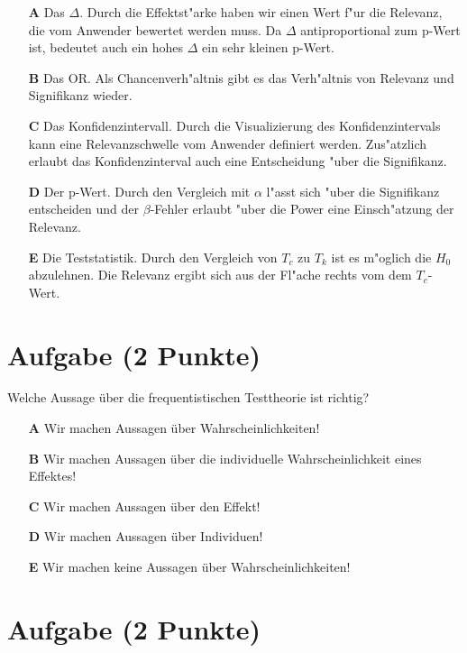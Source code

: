 \documentclass[a4paper, 10pt]{scrartcl}\usepackage[]{graphicx}\usepackage[]{xcolor}
\begin{document}
\begin{enumerate}
\item [\textbf{A} \msquare] Das $\Delta$. Durch die Effektst{"a}rke haben wir einen Wert f{"u}r die Relevanz, die vom Anwender bewertet werden muss. Da $\Delta$ antiproportional zum p-Wert ist, bedeutet auch ein hohes $\Delta$ ein sehr kleinen p-Wert.
\item [\textbf{B} \msquare] Das OR. Als Chancenverh{"a}ltnis gibt es das Verh{"a}ltnis von Relevanz und Signifikanz wieder.
\item [\textbf{C} \msquare] Das Konfidenzintervall. Durch die Visualizierung des Konfidenzintervals kann eine Relevanzschwelle vom Anwender definiert werden. Zus{"a}tzlich erlaubt das Konfidenzinterval auch eine Entscheidung {"u}ber die Signifikanz.
\item [\textbf{D} \msquare] Der p-Wert. Durch den Vergleich mit $\alpha$ l{"a}sst sich {"u}ber die Signifikanz entscheiden und der $\beta$-Fehler erlaubt {"u}ber die Power eine Einsch{"a}tzung der Relevanz.
\item [\textbf{E} \msquare] Die Teststatistik. Durch den Vergleich von $T_c$ zu $T_k$ ist es m{"o}glich die $H_0$ abzulehnen. Die Relevanz ergibt sich aus der Fl{"a}che rechts vom dem $T_c$-Wert.
\end{enumerate}

\section{Aufgabe \hfill (2 Punkte)}



Welche Aussage über die frequentistischen Testtheorie ist richtig?



\begin{enumerate}
\item [\textbf{A} \msquare] Wir machen Aussagen über Wahrscheinlichkeiten!
\item [\textbf{B} \msquare] Wir machen Aussagen über die individuelle Wahrscheinlichkeit eines Effektes!
\item [\textbf{C} \msquare] Wir machen Aussagen über den Effekt!
\item [\textbf{D} \msquare] Wir machen Aussagen über Individuen!
\item [\textbf{E} \msquare] Wir machen keine Aussagen über Wahrscheinlichkeiten!
\end{enumerate}

\section{Aufgabe \hfill (2 Punkte)}
\end{document}
